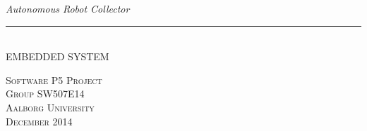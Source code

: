 \thispagestyle{empty}
\begin{flushright}
\vspace{3cm}

\phantom{hul}

\phantom{hul}

\phantom{hul}

\textsl{\Huge Autonomous Robot Collector} \\ 


\rule{14cm}{2mm} \\ 
\Huge EMBEDDED SYSTEM\\ \vspace{1.5cm}

\begin{figure}[H]
\end{figure}

\vspace{2cm} 
\textsc{\Large Software P5 Project \\
Group SW507E14 \\
Aalborg University\\
December 2014\\}
\end{flushright}